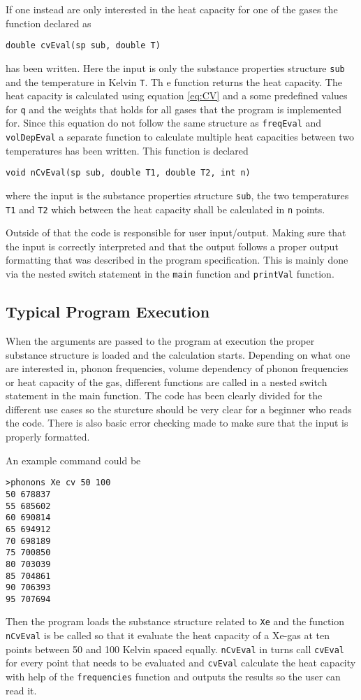 \documentclass[11pt]{article}
\begin{document}
If one instead are only interested in the heat capacity for one of the gases the function declared as
\begin{lstlisting}
double cvEval(sp sub, double T)
\end{lstlisting} 
has been written. Here the input is only the substance properties structure \verb+sub+ and the temperature in Kelvin \verb+T+. Th e function returns the heat capacity. The heat capacity is calculated using equation \ref{eq:CV} and a some predefined values for \verb+q+ and the weights that holds for all gases that the program is implemented for. Since this equation do not follow the same structure as \verb+freqEval+ and \verb+volDepEval+ a separate function to calculate multiple heat capacities between two temperatures has been written. This function is declared
\begin{lstlisting}
void nCvEval(sp sub, double T1, double T2, int n)
\end{lstlisting}
where the input is the substance properties structure \verb+sub+, the two temperatures \verb+T1+ and \verb+T2+ which between the heat capacity shall be calculated in \verb+n+ points.  

Outside of that the code is responsible for user input/output. Making sure that the input is correctly interpreted and that the output follows a proper output formatting that was described in the program specification. This is mainly done via the nested switch statement in the \verb+main+ function and \verb+printVal+ function.

\subsection{Typical Program Execution}
When the arguments are passed to the program at execution the proper substance structure is loaded and the calculation starts. Depending on what one are interested in, phonon frequencies, volume dependency of phonon frequencies or heat capacity of the gas, different functions are called in a nested switch statement in the main function. The code has been clearly divided for the different use cases so the sturcture should be very clear for a beginner who reads the code. There is also basic error checking made to make sure that the input is properly formatted.

An example command could be
\begin{lstlisting}
>phonons Xe cv 50 100
50 678837
55 685602
60 690814
65 694912
70 698189
75 700850
80 703039
85 704861
90 706393
95 707694
\end{lstlisting}
Then the program loads the substance structure related to \verb+Xe+ and the function \verb+nCvEval+ is be called so that it evaluate the heat capacity of a Xe-gas at ten points between 50 and 100 Kelvin spaced equally. \verb+nCvEval+ in turns call \verb+cvEval+ for every point that needs to be evaluated and \verb+cvEval+ calculate the heat capacity with help of the \verb+frequencies+ function and outputs the results so the user can read it.
\end{document}
